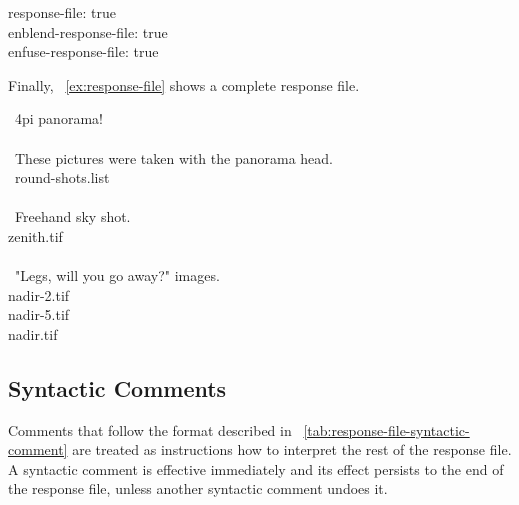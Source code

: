 \begin{literal}
  response-file: true \\
  enblend-response-file: true \\
  enfuse-response-file: true \\
\end{literal}

Finally, \exampleName~\ref{ex:response-file} shows a complete response file.

\begin{exemplar}
  \begin{literal}
    ~4\bslash pi panorama! \\
    \mbox{} \\
    ~These pictures were taken with the panorama head. \\
    ~round-shots.list \\
    \mbox{} \\
    ~Freehand sky shot. \\
    zenith.tif \\
    \mbox{} \\
    ~"Legs, will you go away?" images. \\
    nadir-2.tif \\
    nadir-5.tif \\
    nadir.tif \\
  \end{literal}

  \caption[Complete response file]%
          {\label{ex:response-file}%
            Example of a complete response file.}
\end{exemplar}


\subsection[Syntactic Comments]{\label{sec:syntactic-comments}%
  Syntactic Comments}

Comments that follow the format described in
\tableName~\ref{tab:response-file-syntactic-comment} are treated as instructions how to
interpret the rest of the response file.  A syntactic comment is effective immediately and its
effect persists to the end of the response file, unless another syntactic comment undoes it.

